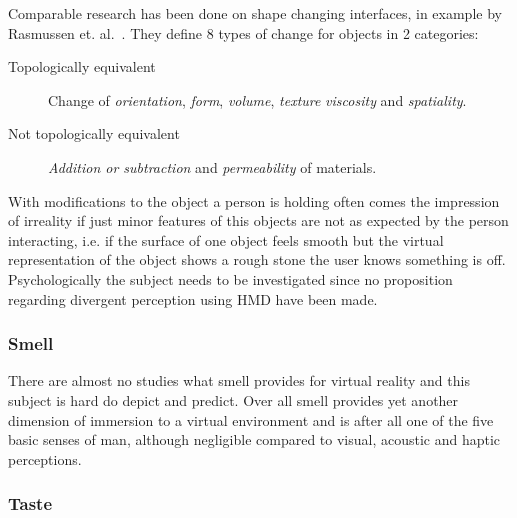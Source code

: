Comparable research has been done on shape changing interfaces, in example by Rasmussen et. al.~\cite{Rasmussen:2012:SIR:2207676.2207781}. They define 8 types of change for objects in 2 categories:

\begin{description}
	\item[Topologically equivalent] Change of \textit{orientation}, \textit{form},  \textit{volume}, \textit{texture} \textit{viscosity} and \textit{spatiality}.
	\item[Not topologically equivalent] \textit{Addition or subtraction} and \textit{permeability} of materials.
\end{description}

With modifications to the object a person is holding often comes the impression of irreality if just minor features of this objects are not as expected by the person interacting, i.e. if the surface of one object feels smooth but the virtual representation of the object shows a rough stone the user knows something is off. \newline
Psychologically the subject needs to be investigated since no proposition regarding divergent perception using HMD have been made.
%

\subsubsection{Smell}

There are almost no studies what smell provides for virtual reality and this subject is hard do depict and predict. Over all smell provides yet another dimension of immersion to a virtual environment and is after all one of the five basic senses of man, although negligible compared to visual, acoustic and haptic perceptions.

\subsubsection{Taste}

